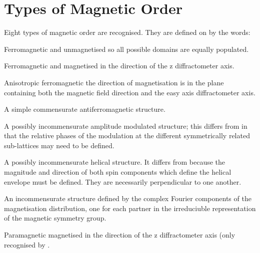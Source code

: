 \section{Types of Magnetic Order}
Eight types of magnetic order are recognised. 
They are defined on \hyperlink{card:Q}{} by 
the words:
\p
\begin{list} {} {\setlength{\labelwidth}{30mm}
  \setlength{\parsep}{-1ex}
  \setlength{\leftmargin}{\labelwidth}
 \addtolength{\leftmargin}{10mm}}
\item[\bd{FERO} \hfill] Ferromagnetic and unmagnetised so all possible 
domains are equally populated.
\item[\bd{FERA} \hfill] Ferromagnetic and magnetised in the direction of the z 
diffractometer axis.
\item[\bd{FANI} \hfill] Anisotropic ferromagnetic the direction of magnetisation is in the plane
containing both the magnetic field direction and the easy axis 
diffractometer axis.
\item[\bd{ANTI} \hfill] A simple commensurate antiferromagnetic structure.
\item[\bd{AMOD} \hfill] A possibly incommensurate amplitude modulated structure; this 
differs from  in that the relative phases of the modulation at the 
different symmetrically related sub-lattices may need to be defined.
\item[\bd{HELI} \hfill] A possibly incommensurate helical structure. 
It differs from  
because the magnitude and direction of both spin components which define the 
helical envelope must be defined. They are necessarily perpendicular to one 
another.
\item[\bd{INCM} \hfill] An incommensurate structure  defined by the complex Fourier
components of the magnetisation distribution, one for each partner in the irreduciuble
representation of the magnetic symmetry group. 
\item[\bd{PARA} \hfill] Paramagnetic magnetised in the direction of the z 
diffractometer axis (only recognised by .\end{list}
\p
